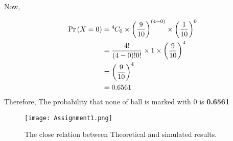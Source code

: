 \documentclass[twocolumn]{article}
\providecommand{\pr}[1]{\ensuremath{\Pr\left(#1\right)}}
\providecommand{\brak}[1]{\ensuremath{\left(#1\right)}}
\newcommand*{\permcomb}[4][0mu]{{{}^{#3}\mkern#1#2_{#4}}}
\newcommand*{\comb}[1][-1mu]{\permcomb[#1]{C}}
\begin{document}
Now,

\begin{align}
\pr{X=0} &= \comb{4}{0} \times \brak{\frac{9}{10}}^{(4-0)} \times \brak{\frac{1}{10}}^{0} \\
&=\frac{4!}{(4-0)! 0!} \times 1 \times \brak{\frac{9}{10}}^{4} \\
&=\brak { \frac{9}{10} } ^{4} \\
&= 0.6561
\end{align}
Therefore, The probability that none of ball is marked with $0$ is \textbf{0.6561}

 \vspace{1cm}


\begin{figure} [h!]
    \centering
    \texttt{[image: Assignment1.png]}
    \caption{The close relation between
Theoretical and simulated results.}
    \label{fig:my_label}
\end{figure}
\end{document}

